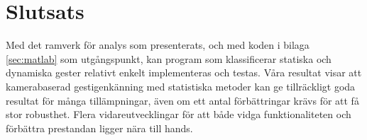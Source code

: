 \documentclass[../rapport_MVEX01-11-05]{subfiles}
\begin{document}
\section{Slutsats}
Med det ramverk för analys som presenterats, och med koden i bilaga
\ref{sec:matlab} som utgångspunkt, kan program som klassificerar
statiska och dynamiska gester relativt enkelt
implementeras och testas. Våra resultat visar att kamerabaserad
gestigenkänning med statistiska metoder kan ge tillräckligt goda resultat
för många tillämpningar, även om ett antal förbättringar krävs för att
få stor robusthet.
Flera vidareutvecklingar för att både vidga
funktionaliteten och förbättra prestandan ligger nära till hands. 

\end{document}
